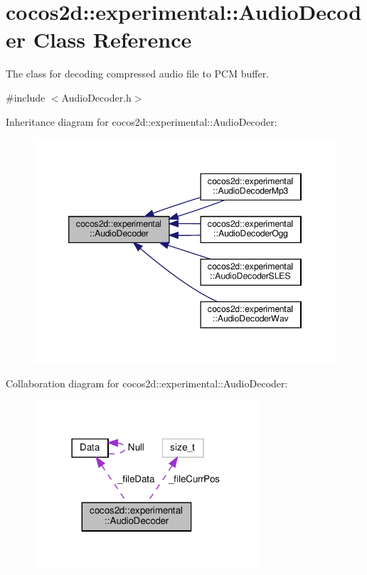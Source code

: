 \hypertarget{classcocos2d_1_1experimental_1_1AudioDecoder}{}\section{cocos2d\+:\+:experimental\+:\+:Audio\+Decoder Class Reference}
\label{classcocos2d_1_1experimental_1_1AudioDecoder}


The class for decoding compressed audio file to P\+CM buffer.  




{\ttfamily \#include $<$Audio\+Decoder.\+h$>$}



Inheritance diagram for cocos2d\+:\+:experimental\+:\+:Audio\+Decoder\+:
\nopagebreak
\begin{figure}[H]
\begin{center}
\leavevmode
\includegraphics[width=346pt]{classcocos2d_1_1experimental_1_1AudioDecoder__inherit__graph}
\end{center}
\end{figure}


Collaboration diagram for cocos2d\+:\+:experimental\+:\+:Audio\+Decoder\+:
\nopagebreak
\begin{figure}[H]
\begin{center}
\leavevmode
\includegraphics[width=237pt]{classcocos2d_1_1experimental_1_1AudioDecoder__coll__graph}
\end{center}
\end{figure}
